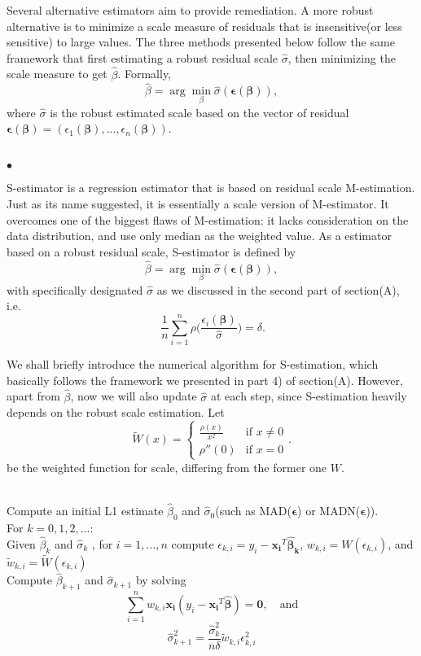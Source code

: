 \documentclass[conference]{IEEEtran}
\begin{document}
Several alternative estimators aim to provide remediation. A more robust alternative is to minimize a scale measure of residuals that is insensitive(or less sensitive) to large values. The three methods presented below follow the same
framework that first estimating a robust residual scale $\hat{\sigma}$, then minimizing the scale measure to get $\hat{\beta}$. Formally, 
$$\hat{\beta} = \arg \min_{\beta} {\hat{\sigma}}(\mathbold{\epsilon}(\mathbold{\beta})),$$
\noindent where $\hat{\sigma}$ is the robust estimated scale based on the vector of residual $\mathbold{\epsilon}(\mathbold{\beta}) = (\epsilon_1(\mathbold{\beta}), ..., \epsilon_n(\mathbold{\beta}))$. \\~

\noindent $\bullet$ 

S-estimator is a regression estimator that is based on residual scale M-estimation. Just as its name suggested, it is essentially a scale version of M-estimator. It overcomes one of the biggest flaws of M-estimation: it lacks consideration on the data distribution, and use only median as the weighted value. As a estimator based on a robust residual scale, S-estimator is defined by
$$\hat{\beta} = \arg \min_{\beta} {\hat{\sigma}}(\mathbold{\epsilon}(\mathbold{\beta})),$$
\noindent with specifically designated $\hat{\sigma}$ as we discussed in the second part of section(A), i.e. 
$$\ \frac{1}{n} \sum_{i = 1}^n \rho \bigg(\frac{\epsilon_i(\mathbold{\beta})}{\hat{\sigma}} \bigg) = \delta.$$

We shall briefly introduce the numerical algorithm for S-estimation, which basically follows the framework we presented in part 4) of section(A). However, apart from $\hat{\beta}$, now we will also update $\hat{\sigma}$ at each step, since S-estimation heavily depends on the robust scale estimation. Let
$$\widetilde{W}(x) =\begin{cases} \frac{\rho(x)}{x^2} & \text{if } x \neq 0 \\ \rho''(0) & \text{if } x = 0 \end{cases}.$$ be the weighted function for scale, differing from the former one $W$. \\~

\noindent {} Compute an initial L1 estimate $\hat{\beta}_0$ and $\hat{\sigma}_0$(such as MAD($\mathbold{\epsilon}$) or MADN($\mathbold{\epsilon}$)). \\
\noindent {} For $k = 0,1,2, ...$: \\
 Given $\hat{\beta}_k$ and $\hat{\sigma}_k$ , for $i = 1,...,n$ compute $\epsilon_{k,i} = y_i - \mathbold{x_i}^T \mathbold{\hat{\beta}_k}$, $w_{k,i} = W(\epsilon_{k,i})$, and $\tilde{w}_{k,i} = \widetilde{W}(\epsilon_{k,i})$ \\
 Compute $\hat{\beta}_{k+1}$ and $\hat{\sigma}_{k+1}$ by solving
$$\sum_{i=1}^n w_{k,i} \mathbold{x_i} (y_i - \mathbold{x_i}^T \mathbold{\hat{\beta}}) = \mathbf{0}, \quad \text{and}$$
$$\hat{\sigma}_{k+1}^2 = \frac{\hat{\sigma}_{k}^2}{n \delta} \tilde{w}_{k,i} \epsilon_{k,i}^2$$
\end{document}
